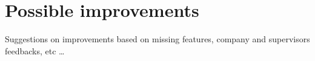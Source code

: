 \section{Possible improvements}\label{sec:concl_fut}

Suggestions on improvements based on missing features, company and supervisors feedbacks, etc \dots
